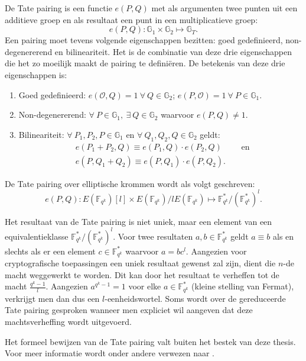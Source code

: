 De Tate pairing is een functie $e(P, Q)$ met als argumenten twee punten uit een additieve groep en als resultaat een punt in een multiplicatieve groep:
\[e(P, Q): \mathbb{G}_1 \times \mathbb{G}_2 \mapsto \mathbb{G}_T.\]
Een pairing moet tevens volgende eigenschappen bezitten: goed gedefinieerd, non-degenererend en bilineariteit. Het is de combinatie van deze drie eigenschappen die het zo moeilijk maakt de pairing te defini\"eren. De betekenis van deze drie eigenschappen is:
\begin{enumerate}
	\item Goed gedefinieerd: $e(\mathcal{O}, Q) = 1 \: \forall \: Q \in \mathbb{G}_2$; $e(P, \mathcal{O}) = 1 \: \forall \: P \in \mathbb{G}_1$.
	
	\item Non-degenererend: $\forall \: P \in \mathbb{G}_1, \: \exists \: Q \in \mathbb{G}_2$ waarvoor $e(P, Q) \neq 1$.
	
	\item Bilineariteit: $\forall \: P_1, P_2, P \in \mathbb{G}_1$ en $\forall \: Q_1, Q_2, Q \in \mathbb{G}_2$ geldt:
		\[\begin{aligned}
			&e(P_1 + P_2, Q) \equiv e(P_1, Q) \cdot e(P_2, Q) \qquad \text{ en }\\
			&e(P, Q_1 + Q_2) \equiv e(P, Q_1) \cdot e(P, Q_2).
		\end{aligned}\]
\end{enumerate}

De Tate pairing over elliptische krommen wordt als volgt geschreven:
\[e(P, Q): E(\mathbb{F}_{q^k})[l] \times E(\mathbb{F}_{q^k})/l E(\mathbb{F}_{q^k}) \mapsto \mathbb{F}_{q^k}^* / (\mathbb{F}_{q^k}^*)^l.\]

Het resultaat van de Tate pairing is niet uniek, maar een element van een equivalentieklasse $\mathbb{F}_{q^k}^* / (\mathbb{F}_{q^k}^*)^l$. Voor twee resultaten $a, b \in \mathbb{F}_{q^k}^*$ geldt $a \equiv b$ als en slechts als er een element $c \in \mathbb{F}_{q^k}^*$ waarvoor $a = bc^l$. Aangezien voor cryptografische toepassingen een uniek resultaat gewenst zal zijn, dient die $n$-de macht weggewerkt te worden. Dit kan door het resultaat te verheffen tot de macht $\frac{q^k - 1 }{l}$. Aangezien $a^{q^k - 1} = 1$ voor elke $a \in \mathbb{F}_{q^k}^*$ (kleine stelling van Fermat), verkrijgt men dan dus een $l$-eenheidswortel. Soms wordt over de gereduceerde Tate pairing gesproken wanneer men expliciet wil aangeven dat deze machtsverheffing wordt uitgevoerd.

Het formeel bewijzen van de Tate pairing valt buiten het bestek van deze thesis. Voor meer informatie wordt onder andere verwezen naar \cite{maas, ruck, hess}.

